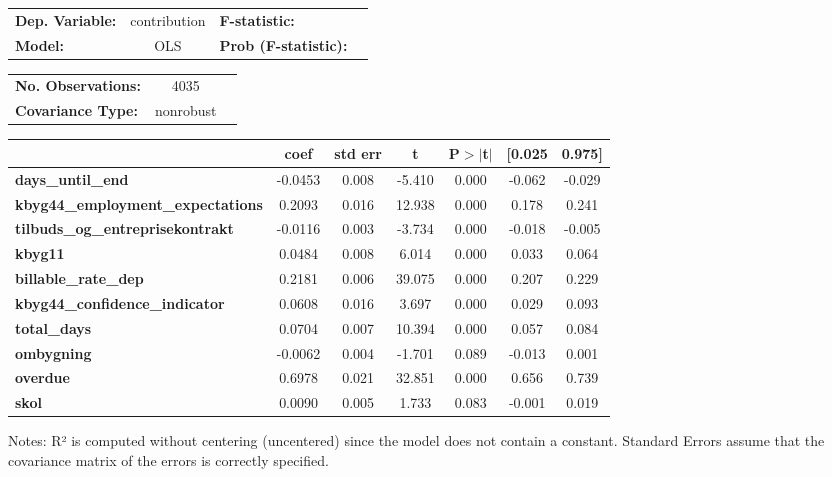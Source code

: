 \begin{center}
\begin{tabular}{lclc}
\toprule
\textbf{Dep. Variable:}                   &  contribution & \textbf{  F-statistic:       }  \\
\textbf{Model:}                           &      OLS      & \textbf{  Prob (F-statistic):}  \\
\bottomrule
\end{tabular}
\begin{tabular}{lcl}
\textbf{No. Observations:}                &       4035    & \textbf{                     }  \\
\textbf{Covariance Type:}                 &   nonrobust   & \textbf{                     }  \\
\bottomrule
\end{tabular}
\begin{tabular}{lcccccc}
                                          & \textbf{coef} & \textbf{std err} & \textbf{t} & \textbf{P$> |$t$|$} & \textbf{[0.025} & \textbf{0.975]}  \\
\midrule
\textbf{days\_until\_end}                 &      -0.0453  &        0.008     &    -5.410  &         0.000        &       -0.062    &       -0.029     \\
\textbf{kbyg44\_employment\_expectations} &       0.2093  &        0.016     &    12.938  &         0.000        &        0.178    &        0.241     \\
\textbf{tilbuds\_og\_entreprisekontrakt}  &      -0.0116  &        0.003     &    -3.734  &         0.000        &       -0.018    &       -0.005     \\
\textbf{kbyg11}                           &       0.0484  &        0.008     &     6.014  &         0.000        &        0.033    &        0.064     \\
\textbf{billable\_rate\_dep}              &       0.2181  &        0.006     &    39.075  &         0.000        &        0.207    &        0.229     \\
\textbf{kbyg44\_confidence\_indicator}    &       0.0608  &        0.016     &     3.697  &         0.000        &        0.029    &        0.093     \\
\textbf{total\_days}                      &       0.0704  &        0.007     &    10.394  &         0.000        &        0.057    &        0.084     \\
\textbf{ombygning}                        &      -0.0062  &        0.004     &    -1.701  &         0.089        &       -0.013    &        0.001     \\
\textbf{overdue}                          &       0.6978  &        0.021     &    32.851  &         0.000        &        0.656    &        0.739     \\
\textbf{skol}                             &       0.0090  &        0.005     &     1.733  &         0.083        &       -0.001    &        0.019     \\
\bottomrule
\end{tabular}
\end{center}

Notes: \newline
 [1] R² is computed without centering (uncentered) since the model does not contain a constant. \newline
 [2] Standard Errors assume that the covariance matrix of the errors is correctly specified.